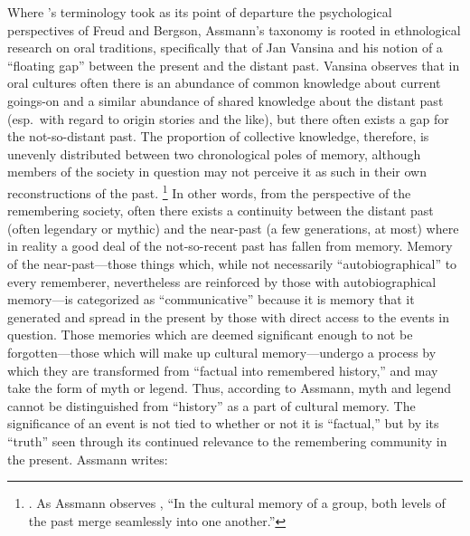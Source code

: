 Where \halbwachs's terminology took as its point of departure the psychological perspectives of Freud\autocite{terdiman_radstone-schwarz2011} and Bergson\autocite{ansellpearson_radstone-schwarz2011}, Assmann's taxonomy is rooted in ethnological research on oral traditions, specifically that of Jan Vansina and his notion of a ``floating gap'' between the present and the distant past.\autocite{vansina1985} Vansina observes that in oral cultures often there is an abundance of common knowledge about current goings-on and a similar abundance of shared knowledge about the distant past (esp.~with regard to origin stories and the like), but there often exists a gap for the not-so-distant past. The proportion of collective knowledge, therefore, is unevenly distributed between two chronological poles of memory, although members of the society in question may not perceive it as such in their own reconstructions of the past.%
%
\footnote{\Cite[23--24]{vansina1985}. As Assmann observes \autocite[35]{assmann2011}, ``In the cultural memory of a group, both levels of the past merge seamlessly into one another.''}
%
In other words, from the perspective of the remembering society, often there exists a continuity between the distant past (often legendary or mythic) and the near-past (a few generations, at most) where in reality a good deal of the not-so-recent past has fallen from memory. Memory of the near-past---those things which, while not necessarily ``autobiographical'' to every rememberer, nevertheless are reinforced by those with autobiographical memory---is categorized as ``communicative'' because it is memory that it generated and spread in the present by those with direct access to the events in question. Those memories which are deemed significant enough to not be forgotten---those which will make up cultural memory---undergo a process by which they are transformed from ``factual into remembered history,'' and may take the form of myth or legend.\autocite[37--38]{assmann2011} Thus, according to Assmann, myth and legend cannot be distinguished from ``history'' as a part of cultural memory. The significance of an event is not tied to whether or not it is ``factual,'' but by its ``truth'' seen through its continued relevance to the remembering community in the present.\autocite[Paul Veyne offers a particularly stimulating discussion of the perception of the past and its relationship to myth. He concludes his book with the insightful quote, ``The theme of this book was very simple. Merely by reading the title, anyone with the slightest historical background would immediately have answered, `but of course they believed in their myths!' We have simply wanted also to make clear that what is true of `them' is also true of ourselves and to bring out the implications of this primary truth.''][128--129]{veyne1988} Assmann writes:  

